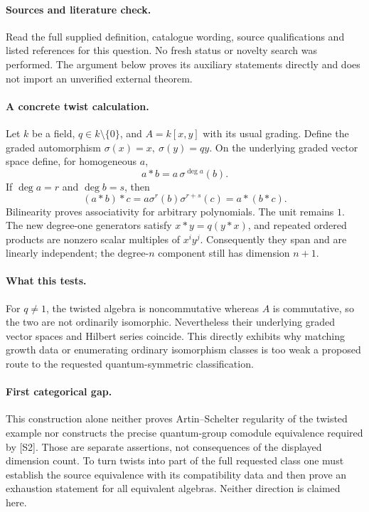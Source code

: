 \documentclass[11pt]{article}
\begin{document}
\paragraph{Sources and literature check.}
Read the full supplied definition, catalogue wording, source qualifications and listed references for this question. No fresh status or novelty search was performed. The argument below proves its auxiliary statements directly and does not import an unverified external theorem.

\paragraph{A concrete twist calculation.} Let \(k\) be a field, \(q\in k\setminus\{0\}\), and \(A=k[x,y]\) with its usual grading. Define the graded automorphism \(\sigma(x)=x,\ \sigma(y)=qy\). On the underlying graded vector space define, for homogeneous \(a\),
\[
 a*b=a\,\sigma^{\deg a}(b).
\]
If \(\deg a=r\) and \(\deg b=s\), then
\[
 (a*b)*c=a\sigma^r(b)\sigma^{r+s}(c)
 =a*(b*c).
\]
Bilinearity proves associativity for arbitrary polynomials. The unit remains \(1\). The new degree-one generators satisfy \(x*y=q(y*x)\), and repeated ordered products are nonzero scalar multiples of \(x^iy^j\). Consequently they span and are linearly independent; the degree-\(n\) component still has dimension \(n+1\).
\paragraph{What this tests.} For \(q\ne1\), the twisted algebra is noncommutative whereas \(A\) is commutative, so the two are not ordinarily isomorphic. Nevertheless their underlying graded vector spaces and Hilbert series coincide. This directly exhibits why matching growth data or enumerating ordinary isomorphism classes is too weak a proposed route to the requested quantum-symmetric classification.
\paragraph{First categorical gap.} This construction alone neither proves Artin--Schelter regularity of the twisted example nor constructs the precise quantum-group comodule equivalence required by [S2]. Those are separate assertions, not consequences of the displayed dimension count. To turn twists into part of the full requested class one must establish the source equivalence with its compatibility data and then prove an exhaustion statement for all equivalent algebras. Neither direction is claimed here.
\end{document}
